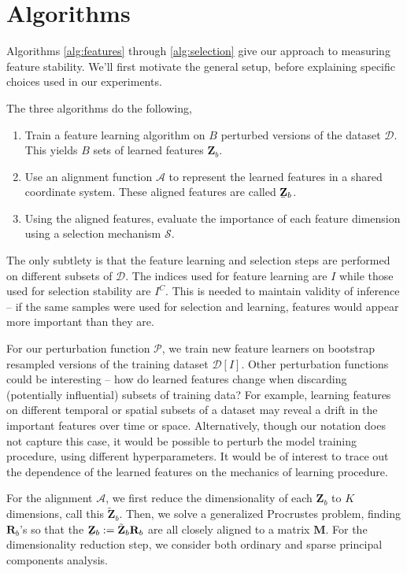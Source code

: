 
\section{Algorithms}
\label{sec:algorithms}

Algorithms \ref{alg:features} through \ref{alg:selection} give our approach to
measuring feature stability. We'll first motivate the general setup, before
explaining specific choices used in our experiments.

The three algorithms do the following,
\begin{enumerate}
  \item Train a feature learning algorithm on $B$ perturbed versions of the
    dataset $\mathcal{D}$. This yields $B$ sets of learned features
    $\mathbf{Z}_{b}$.
  \item Use an alignment function $\mathcal{A}$ to represent the learned
    features in a shared coordinate system. These aligned features are called
    $\underaccent{\bar}{\mathbf{Z}}_{b}$.
  \item Using the aligned features, evaluate the importance of each feature
    dimension using a selection mechanism $\mathcal{S}$.
\end{enumerate}

The only subtlety is that the feature learning and selection steps are performed
on different subsets of $\mathcal{D}$. The indices used for feature learning are
$I$ while those used for selection stability are $I^{C}$. This is needed to
maintain validity of inference -- if the same samples were used for selection
and learning, features would appear more important than they are.

For our perturbation function $\mathcal{P}$, we train new feature learners on
bootstrap resampled versions of the training dataset
$\mathcal{D}\left[I\right]$. Other perturbation functions could be interesting
-- how do learned features change when discarding (potentially influential)
subsets of training data? For example, learning features on different temporal
or spatial subsets of a dataset may reveal a drift in the important features
over time or space. Alternatively, though our notation does not capture this
case, it would be possible to perturb the model training procedure, using
different hyperparameters. It would be of interest to trace out the dependence
of the learned features on the mechanics of learning procedure.

For the alignment $\mathcal{A}$, we first reduce the dimensionality of each
$\mathbf{Z}_{b}$ to $K$ dimensions, call this $\tilde{\mathbf{Z}}_{b}$. Then, we
solve a generalized Procrustes problem, finding $\mathbf{R}_{b}$'s so that the
$\underaccent{\bar}{\mathbf{Z}}_{b} := \tilde{\mathbf{Z}}_{b}\mathbf{R}_{b}$ are
all closely aligned to a matrix $\mathbf{M}$. For the dimensionality reduction
step, we consider both ordinary and sparse principal components analysis.

